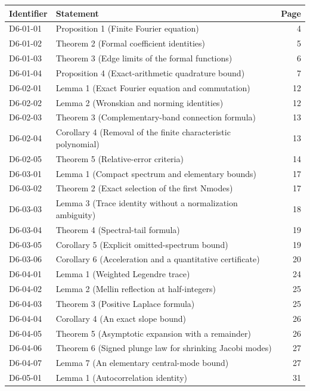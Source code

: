 \documentclass[11pt,a4paper]{article}
\begin{document}
{\footnotesize\begin{longtable}{@{}l>{\raggedright\arraybackslash}p{}r@{}}
\toprule Identifier & Statement & Page\\\midrule\endhead
D6-01-01 & Proposition 1 (Finite Fourier equation) & 4\\
D6-01-02 & Theorem 2 (Formal coefficient identities) & 5\\
D6-01-03 & Theorem 3 (Edge limits of the formal functions) & 6\\
D6-01-04 & Proposition 4 (Exact-arithmetic quadrature bound) & 7\\
D6-02-01 & Lemma 1 (Exact Fourier equation and commutation) & 12\\
D6-02-02 & Lemma 2 (Wronskian and norming identities) & 12\\
D6-02-03 & Theorem 3 (Complementary-band connection formula) & 13\\
D6-02-04 & Corollary 4 (Removal of the finite characteristic polynomial) & 13\\
D6-02-05 & Theorem 5 (Relative-error criteria) & 14\\
D6-03-01 & Lemma 1 (Compact spectrum and elementary bounds) & 17\\
D6-03-02 & Theorem 2 (Exact selection of the first Nmodes) & 17\\
D6-03-03 & Lemma 3 (Trace identity without a normalization ambiguity) & 18\\
D6-03-04 & Theorem 4 (Spectral-tail formula) & 19\\
D6-03-05 & Corollary 5 (Explicit omitted-spectrum bound) & 19\\
D6-03-06 & Corollary 6 (Acceleration and a quantitative certificate) & 20\\
D6-04-01 & Lemma 1 (Weighted Legendre trace) & 24\\
D6-04-02 & Lemma 2 (Mellin reflection at half-integers) & 25\\
D6-04-03 & Theorem 3 (Positive Laplace formula) & 25\\
D6-04-04 & Corollary 4 (An exact slope bound) & 26\\
D6-04-05 & Theorem 5 (Asymptotic expansion with a remainder) & 26\\
D6-04-06 & Theorem 6 (Signed plunge law for shrinking Jacobi modes) & 27\\
D6-04-07 & Lemma 7 (An elementary central-mode bound) & 27\\
D6-05-01 & Lemma 1 (Autocorrelation identity) & 31\\

\end{longtable}}
\end{document}

